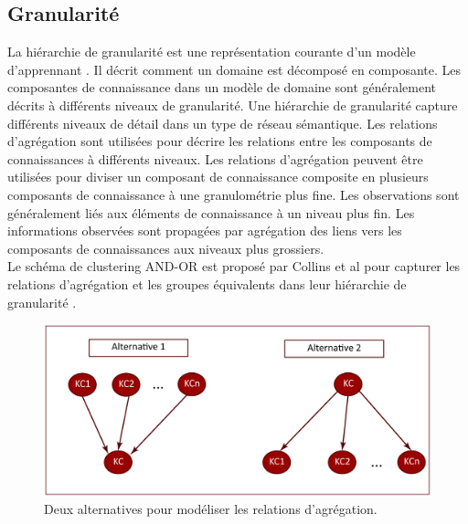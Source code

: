 \subsection{Granularité}
La hiérarchie de granularité est une représentation courante d'un modèle d'apprennant \cite{bayesian_networks_student_model_engineering}. Il décrit comment un domaine est décomposé en composante. Les composantes de connaissance dans un modèle de domaine sont généralement décrits à différents niveaux de granularité. Une hiérarchie de granularité capture différents niveaux de détail dans un type de réseau sémantique. Les relations d'agrégation sont utilisées pour décrire les relations entre les composants de connaissances à différents niveaux. Les relations d'agrégation peuvent être utilisées pour diviser un composant de connaissance composite en plusieurs composants de connaissance à une granulométrie plus fine. Les observations sont généralement liés aux éléments de connaissance à un niveau plus fin. Les informations observées sont propagées par agrégation des liens vers les composants de connaissances aux niveaux plus grossiers.\\
Le schéma de clustering AND-OR est proposé par Collins et al pour capturer les relations d'agrégation et les groupes équivalents dans leur hiérarchie de granularité \cite{adaptive_assessment_using_granularity_hierarchies_and_bayesian_nets}.
\begin{figure}[H]
	\begin{center}
		\includegraphics[width=\textwidth]{images/chapitre2/Modèles-d'équations-structurelles.png}
	\end{center}
\caption{Deux alternatives pour modéliser les relations d'agrégation.}
\label{two_agregationrelationships}
\end{figure}

